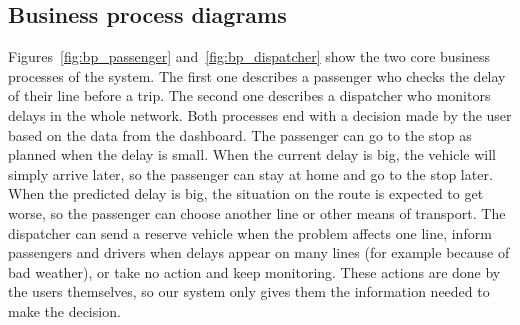 \documentclass[11pt]{article}
\begin{document}
\FloatBarrier
\subsection{Business process diagrams}

Figures~\ref{fig:bp_passenger} and~\ref{fig:bp_dispatcher} show the two core business processes of the system. The first one describes a passenger who checks the delay of their line before a trip. The second one describes a dispatcher who monitors delays in the whole network. Both processes end with a decision made by the user based on the data from the dashboard. The passenger can go to the stop as planned when the delay is small. When the current delay is big, the vehicle will simply arrive later, so the passenger can stay at home and go to the stop later. When the predicted delay is big, the situation on the route is expected to get worse, so the passenger can choose another line or other means of transport. The dispatcher can send a reserve vehicle when the problem affects one line, inform passengers and drivers when delays appear on many lines (for example because of bad weather), or take no action and keep monitoring. These actions are done by the users themselves, so our system only gives them the information needed to make the decision.
\end{document}
